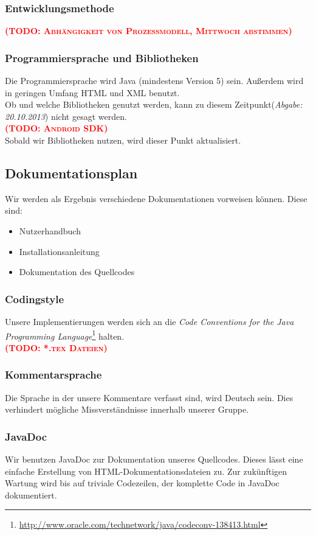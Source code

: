 \documentclass[fontsize=12pt,paper=a4,twoside]{scrartcl}
\newcommand{\todo}[1]{\textbf{\textsc{\textcolor{red}{(TODO: #1)}}}}
\begin{document}
\subsubsection{Entwicklungsmethode}

\todo{Abhängigkeit von Prozessmodell, Mittwoch abstimmen}

\subsubsection{Programmiersprache und Bibliotheken}
Die Programmiersprache wird Java  (mindestens Version 5) sein. Außerdem wird in geringen Umfang HTML und XML benutzt.\\
Ob und welche Bibliotheken genutzt werden, kann zu diesem Zeitpunkt(\emph{Abgabe: 20.10.2013}) nicht gesagt werden.\\
\todo{Android SDK}
\\
Sobald wir Bibliotheken nutzen, wird dieser Punkt aktualisiert.
\subsection{Dokumentationsplan}
Wir werden als Ergebnis verschiedene Dokumentationen vorweisen können. Diese sind:

\begin{itemize}
\item{Nutzerhandbuch}
\item{Installationsanleitung}
\item{Dokumentation des Quellcodes}
\end{itemize}

\subsubsection{Codingstyle}
Unsere Implementierungen werden sich an die \emph{Code Conventions for the Java Programming Language}\footnote{\url{http://www.oracle.com/technetwork/java/codeconv-138413.html}} halten.\\
\todo{*.tex Dateien}

\subsubsection{Kommentarsprache}
Die Sprache in der unsere Kommentare verfasst sind, wird Deutsch sein. Dies verhindert mögliche Missverständnisse innerhalb unserer Gruppe.

\subsubsection{JavaDoc}
Wir benutzen JavaDoc zur Dokumentation unseres Quellcodes. Dieses lässt eine einfache Erstellung von HTML-Dokumentationsdateien zu.
Zur zukünftigen Wartung wird bis auf triviale Codezeilen, der komplette Code in JavaDoc dokumentiert.
\end{document}
